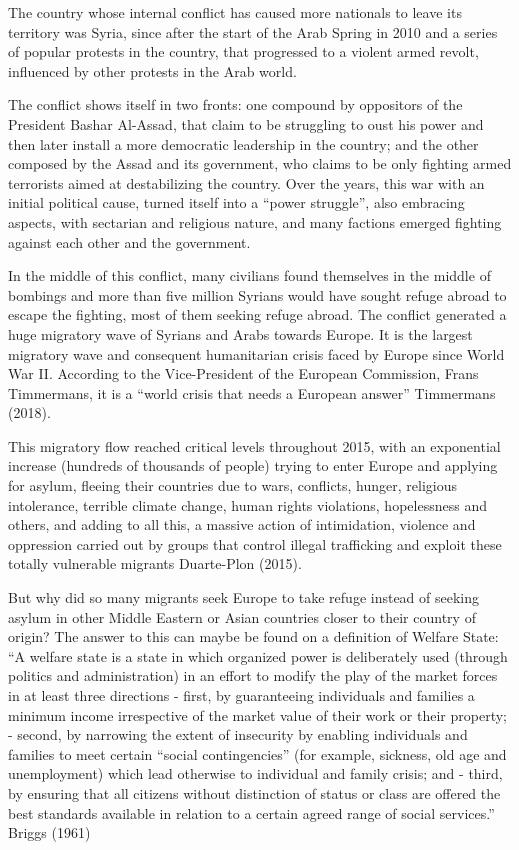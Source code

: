 \documentclass[]{elsarticle} %
\begin{document}
The country whose internal conflict has caused more nationals to leave
its territory was Syria, since after the start of the Arab Spring in
2010 and a series of popular protests in the country, that progressed to
a violent armed revolt, influenced by other protests in the Arab world.

The conflict shows itself in two fronts: one compound by oppositors of
the President Bashar Al-Assad, that claim to be struggling to oust his
power and then later install a more democratic leadership in the
country; and the other composed by the Assad and its government, who
claims to be only fighting armed terrorists aimed at destabilizing the
country. Over the years, this war with an initial political cause,
turned itself into a ``power struggle'', also embracing aspects, with
sectarian and religious nature, and many factions emerged fighting
against each other and the government.

In the middle of this conflict, many civilians found themselves in the
middle of bombings and more than five million Syrians would have sought
refuge abroad to escape the fighting, most of them seeking refuge
abroad. The conflict generated a huge migratory wave of Syrians and
Arabs towards Europe. It is the largest migratory wave and consequent
humanitarian crisis faced by Europe since World War II. According to the
Vice-President of the European Commission, Frans Timmermans, it is a
``world crisis that needs a European answer'' Timmermans (2018).

This migratory flow reached critical levels throughout 2015, with an
exponential increase (hundreds of thousands of people) trying to enter
Europe and applying for asylum, fleeing their countries due to wars,
conflicts, hunger, religious intolerance, terrible climate change, human
rights violations, hopelessness and others, and adding to all this, a
massive action of intimidation, violence and oppression carried out by
groups that control illegal trafficking and exploit these totally
vulnerable migrants Duarte-Plon (2015).

But why did so many migrants seek Europe to take refuge instead of
seeking asylum in other Middle Eastern or Asian countries closer to
their country of origin? The answer to this can maybe be found on a
definition of Welfare State: ``A welfare state is a state in which
organized power is deliberately used (through politics and
administration) in an effort to modify the play of the market forces in
at least three directions - first, by guaranteeing individuals and
families a minimum income irrespective of the market value of their work
or their property; - second, by narrowing the extent of insecurity by
enabling individuals and families to meet certain ``social
contingencies'' (for example, sickness, old age and unemployment) which
lead otherwise to individual and family crisis; and - third, by ensuring
that all citizens without distinction of status or class are offered the
best standards available in relation to a certain agreed range of social
services.'' Briggs (1961)
\end{document}
